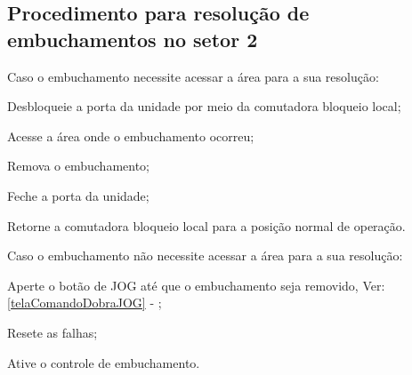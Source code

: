 \ifmachineType

\subsection{Procedimento para resolução de embuchamentos no setor 2}

\begin{procedureFixingIsuesSector2}

  \item[\ding{\dingNumber}] Caso o embuchamento necessite acessar a área para a sua resolução:
  

  \begin{procedureFixingIsuesSector2.1}
  
    \item[\ding{\dingNumber}] Desbloqueie a porta da unidade por meio da comutadora bloqueio local;
    \item[\ding{\dingNumber}] Acesse a área onde o embuchamento ocorreu;
    \item[\ding{\dingNumber}] Remova o embuchamento;
    \item[\ding{\dingNumber}] Feche a porta da unidade;
    \item[\ding{\dingNumber}] Retorne a comutadora bloqueio local para a posição normal de operação.
    
  \end{procedureFixingIsuesSector2.1}

  \item[\ding{\dingNumber}] Caso o embuchamento não necessite acessar a área para a sua resolução:
  

  \begin{procedureFixingIsuesSector2.2}
  
    \item[\ding{\dingNumber}] Aperte o botão de JOG até que o embuchamento seja removido, Ver: \ref{telaComandoDobraJOG} - ;
    
  \end{procedureFixingIsuesSector2.2}
  
  \item[\ding{\dingNumber}] Resete as falhas;
  \item[\ding{\dingNumber}] Ative o controle de embuchamento.
  
\end{procedureFixingIsuesSector2}

